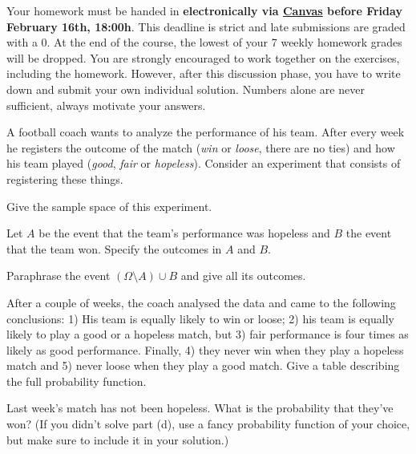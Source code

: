 \documentclass[a4paper,10pt,landscape,twocolumn]{scrartcl}
\newcommand\deadline{Friday February 16th, 18:00h}
\begin{document}
\homeworkproblems

{\sffamily\noindent
  Your homework must be handed in \textbf{electronically via
  \href{\canvasURL}{Canvas} before \deadline}. This deadline is strict and late
  submissions are graded with a 0. At the end of the course, the lowest of your
  7 weekly homework grades will be dropped. You are strongly encouraged to work
  together on the exercises, including the homework. However, after this
  discussion phase, you have to write down and submit your own individual
  solution. Numbers alone are never sufficient, always motivate your answers.
}


\begin{exercise}[Football (4pt)]
  A football coach wants to analyze the performance of his team. After every
  week he registers the outcome of the match (\emph{win} or \emph{loose}, there
  are no ties) and how his team played (\emph{good}, \emph{fair} or
  \emph{hopeless}). Consider an experiment that consists of registering these
  things.
  
  \begin{subex}[0.5pt]
    Give the sample space of this experiment.	
  \end{subex}
  
  \begin{subex}[0.5pt]
    Let $A$ be the event that the team's performance was hopeless and $B$ the
    event that the team won. Specify the outcomes in $A$ and $B$.
  \end{subex}
  
  \begin{subex}[1pt]
    Paraphrase the event $(\Omega \setminus A) \cup B$ and give all its
    outcomes.
  \end{subex}
  
  \begin{subex}[1pt]
    After a couple of weeks, the coach analysed the data and came to the
    following conclusions: 1) His team is equally likely to win or loose; 2)
    his team is equally likely to play a good or a hopeless match, but 3)  fair
    performance is four times as likely as good performance. Finally, 4) they
    never win when they play a hopeless match and 5) never loose when they play
    a good match. Give a table describing the full probability function.
  \end{subex}
  
  \begin{subex}[1pt]
    Last week's match has not been hopeless. What is the probability that
    they've won? (If you didn't solve part (d), use a fancy probability
    function of your choice, but make sure to include it in your solution.)
  \end{subex}
\end{exercise}
\end{document}
